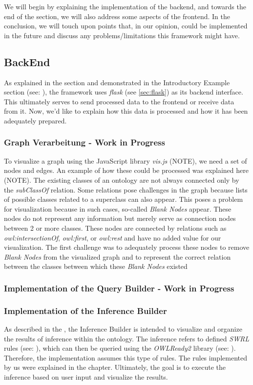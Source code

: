We will begin by explaining the implementation of the backend, and towards the end of the section, we will also address some aspects of the frontend. In the conclusion, we will touch upon points that, in our opinion, could be implemented in the future and discuss any problems/limitations this framework might have.
\subsection{BackEnd}

As explained in the  section and demonstrated in the Introductory Example section (see: ), the framework uses \textit{flask} (see \ref{sec:flask}) as its backend interface. 
This ultimately serves to send processed data to the frontend or receive data from it. Now, we'd like to explain how this data is processed and how it has been adequately prepared.
\subsubsection{Graph Verarbeitung - Work in Progress}

To visualize a graph using the JavaScript library \textit{vis.js} (NOTE), we need a set of nodes and edges. An example of how these could be processed was explained here (NOTE). The existing classes of an ontology are not always connected only by the \textit{subClassOf} relation. Some relations pose challenges in the graph because lists of possible classes related to a superclass can also appear. This poses a problem for visualization because in such cases, so-called \textit{Blank Nodes} appear. These nodes do not represent any information but merely serve as connection nodes between 2 or more classes. These nodes are connected by relations such as \textit{owl:intersectionOf}, \textit{owl:first}, or \textit{owl:rest} and have no added value for our visualization. The first challenge was to adequately process these nodes to remove \textit{Blank Nodes} from the visualized graph and to represent the correct relation between the classes between which these \textit{Blank Nodes} existed

\subsubsection{Implementation of the Query Builder - Work in Progress}


\subsubsection{Implementation of the Inference Builder}
As described in the , the Inference Builder is intended to visualize and organize the results of inference within the ontology. 
The inference refers to defined \textit{SWRL} rules (see: ), which can then be queried using the \textit{OWLReady2} library (see: ).
Therefore, the implementation assumes this type of rules. The rules implemented by us were explained in the  chapter. 
Ultimately, the goal is to execute the inference based on user input and visualize the results.
